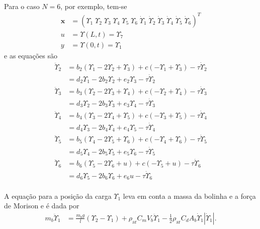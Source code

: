 \paragraph{} Para o caso $N=6$, por exemplo, tem-se \begin{align}
\mathbf{x} &= \left(\Upsilon_1\;\Upsilon_2\;\Upsilon_3\;\Upsilon_4\;\Upsilon_5\;\Upsilon_6\;\dot{\Upsilon}_1\;\dot{\Upsilon}_2\;\dot{\Upsilon}_3\;\dot{\Upsilon}_4\;\dot{\Upsilon}_5\;\dot{\Upsilon}_6\right)^T 	\\
u &= \Upsilon(L,t) = \Upsilon_7\label{ufor6}\\
y &= \Upsilon(0,t) = \Upsilon_1\label{yfor6}
 \end{align} e as equações são \begin{align}
 	\ddot{\Upsilon}_2 &=  b_2\left(\Upsilon_{1}-2\Upsilon_{2} + \Upsilon_{3}\right)+c(-\Upsilon_1 + \Upsilon_3)-\tau \dot{\Upsilon}_2\nonumber \\
 	&= d_2\Upsilon_1 - 2b_2 \Upsilon_2 + e_2\Upsilon_3 - \tau \dot{\Upsilon}_2 \label{upsilon2}\\
 	\ddot{\Upsilon}_3 &=  b_3\left(\Upsilon_{2}-2\Upsilon_{3} + \Upsilon_{4}\right)+c(-\Upsilon_2 + \Upsilon_4)-\tau \dot{\Upsilon}_3\nonumber \\
 	&= d_3\Upsilon_2 - 2b_3 \Upsilon_3 + e_3\Upsilon_4 - \tau \dot{\Upsilon}_3\\
 	\ddot{\Upsilon}_4 &=  b_4\left(\Upsilon_{3}-2\Upsilon_{4} + \Upsilon_{5}\right)+c(-\Upsilon_3 + \Upsilon_5)-\tau \dot{\Upsilon}_4 \nonumber\\
 	&= d_4\Upsilon_3 - 2b_4 \Upsilon_4 + e_4\Upsilon_5 - \tau \dot{\Upsilon}_4\\
 	\ddot{\Upsilon}_5 &=  b_5\left(\Upsilon_{4}-2\Upsilon_{5} + \Upsilon_{6}\right)+c(-\Upsilon_4 + \Upsilon_6)-\tau \dot{\Upsilon}_5\nonumber\\
 	&= d_5\Upsilon_4 - 2b_5 \Upsilon_5 + e_5\Upsilon_6 - \tau \dot{\Upsilon}_5\\
 	\ddot{\Upsilon}_6 &=  b_6\left(\Upsilon_{5}-2\Upsilon_{6} + u\right)+c(-\Upsilon_5 + u)-\tau \dot{\Upsilon}_6\nonumber\\
 	&= d_6\Upsilon_5 - 2b_6 \Upsilon_6 + e_6 u - \tau \dot{\Upsilon}_6 \label{upsilon6}
 \end{align}

\paragraph{} A equação para a posição da carga $\Upsilon_1$ leva em conta a massa da bolinha e a força de Morison e é dada por \begin{align}
 	m_b \ddot{\Upsilon}_1 &= \frac{m_b g}{l}\left(\Upsilon_2 - \Upsilon_1\right) + \rho_{\mathrm{ar}} C_m V_b \ddot{\Upsilon}_1 - \frac{1}{2}\rho_{\textrm{ar}} C_d A_b \dot{\Upsilon}_1 \left|\dot{\Upsilon}_1\right|.\label{upsilon1previa}
 \end{align} 
 
